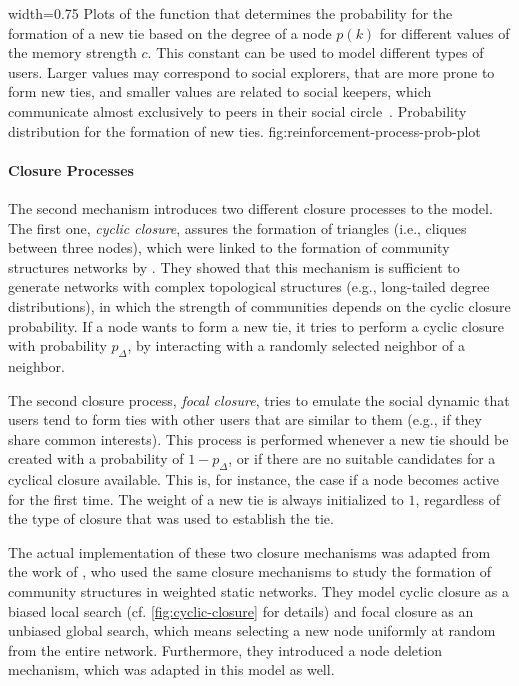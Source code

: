       {width=0.75\textwidth}
      {Plots of the function that determines the probability for the formation of a new tie based on the degree of a node \( p(k) \) for different values of the memory strength \( c \). This constant can be used to model different types of users. Larger values may correspond to social explorers, that are more prone to form new ties, and smaller values are related to social keepers, which communicate almost exclusively to peers in their social circle~\cite{Miritello2013}.}
      {Probability distribution for the formation of new ties.}
      {fig:reinforcement-process-prob-plot}


\paragraph{Closure Processes}
The second mechanism introduces two different closure processes to the model.
The first one, \emph{cyclic closure}, assures the formation of triangles (i.e., cliques between three nodes), which were linked to the formation of community structures networks by \citet{Bianconi2014}.
They showed that this mechanism is sufficient to generate networks with complex topological structures (e.g., long-tailed degree distributions), in which the strength of communities depends on the cyclic closure probability.
If a node wants to form a new tie, it tries to perform a cyclic closure with probability \( p_{\Delta} \), by interacting with a randomly selected neighbor of a neighbor.

The second closure process, \emph{focal closure}, tries to emulate the social dynamic that users tend to form ties with other users that are similar to them (e.g., if they share common interests).
This process is performed whenever a new tie should be created with a probability of \( 1 - p_{\Delta} \), or if there are no suitable candidates for a cyclical closure available.
This is, for instance, the case if a node becomes active for the first time.
The weight of a new tie is always initialized to \( 1 \), regardless of the type of closure that was used to establish the tie.

The actual implementation of these two closure mechanisms was adapted from the work of \citet{Kumpula2007}, who used the same closure mechanisms to study the formation of community structures in weighted static networks.
They model cyclic closure as a biased local search (cf. \cref{fig:cyclic-closure} for details) and focal closure as an unbiased global search, which means selecting a new node uniformly at random from the entire network.
Furthermore, they introduced a node deletion mechanism, which was adapted in this model as well.


